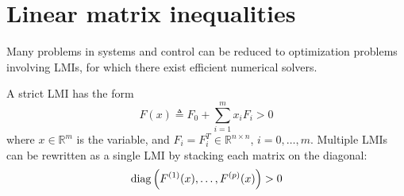 \section{Linear matrix inequalities}
Many problems in systems and control can be reduced to optimization problems involving LMIs, for which there exist efficient numerical solvers.

A strict LMI has the form
\begin{equation}
    F(x) \triangleq F_0 + \sum_{i=1}^m x_i F_i > 0
\end{equation}
where $x \in \mathbb{R}^m$ is the variable, and $F_i = F_i^T \in \mathbb{R}^{n \times n}$, $i = 0, \dots, m$. Multiple LMIs can be rewritten as a single LMI by stacking each matrix on the diagonal:
\begin{equation}
    \operatorname{diag} \left( F^{(1)}(x), \dots, F^{(p)}(x) \right) > 0
\end{equation}

